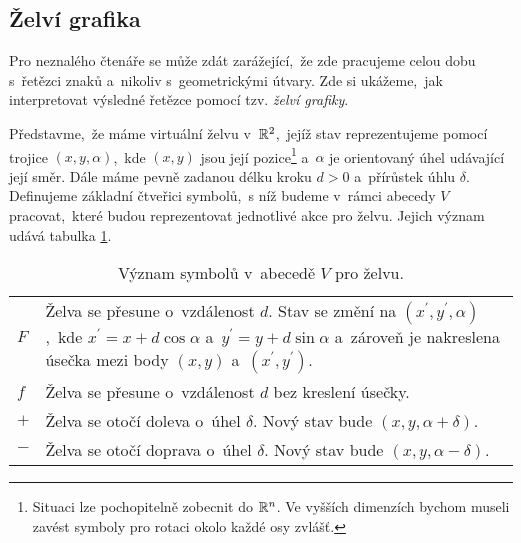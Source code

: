 \subsection{Želví grafika}\label{subsec:zelvi-grafika}

Pro neznalého čtenáře se může zdát zarážející,~že zde pracujeme celou dobu s~řetězci znaků a~nikoliv s~geometrickými útvary. Zde si ukážeme,~jak interpretovat výsledné řetězce pomocí tzv. \emph{želví grafiky}.

Představme,~že máme virtuální želvu v~$\mathbb{R}^2$,~jejíž stav reprezentujeme pomocí trojice $(x,y,\alpha)$,~kde $(x,y)$ jsou její pozice\footnote{Situaci lze pochopitelně zobecnit do $\mathbb{R}^n$. Ve vyšších dimenzích bychom museli zavést symboly pro rotaci okolo každé osy zvlášť.} a~$\alpha$ je orientovaný úhel udávající její směr. Dále máme pevně zadanou délku kroku $d>0$ a~přírůstek úhlu $\delta$. Definujeme základní čtveřici symbolů,~s níž budeme v~rámci abecedy $V$ pracovat,~které budou reprezentovat jednotlivé akce pro želvu. Jejich význam udává tabulka \ref{table:vyznam-symbolu-zelva}.
\begin{table}[h]
    \centering
    \begin{tabular}{lp{}}
        $F$ & Želva se přesune o~vzdálenost $d$. Stav se změní na $(x^\prime,y^\prime,\alpha)$,~kde $x^\prime=x+d\cos\alpha$ a~$y^\prime=y+d\sin\alpha$ a~zároveň je nakreslena úsečka mezi body $(x,y)$ a~$(x^\prime,y^\prime)$.\\
        $f$ & Želva se přesune o~vzdálenost $d$ bez kreslení úsečky.\\
        $+$ & Želva se otočí doleva o~úhel $\delta$. Nový stav bude $(x,y,\alpha+\delta)$.\\
        $-$ & Želva se otočí doprava o~úhel $\delta$. Nový stav bude $(x,y,\alpha-\delta)$.
    \end{tabular}
    \caption{Význam symbolů v~abecedě $V$ pro želvu.}
    \label{table:vyznam-symbolu-zelva}
\end{table}

